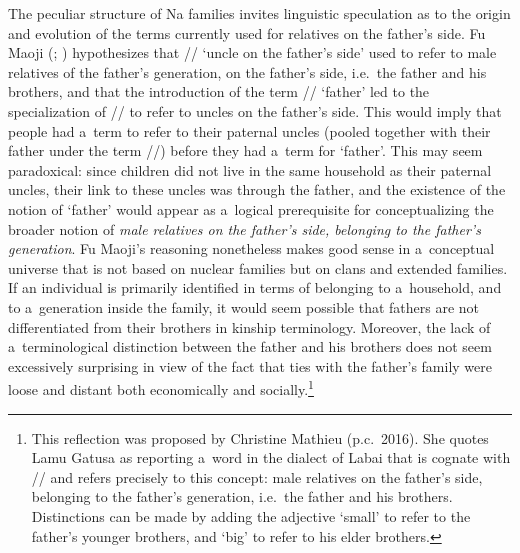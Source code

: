 	The peculiar structure of Na families invites linguistic speculation as to the origin and
	evolution of the terms currently used for relatives on the father’s
	side. Fu Maoji (\citeyear[23]{fu1980}; \citeyear[38–39]{fu1983}) hypothesizes that // ‘uncle on the father’s side’ used to refer to male
	relatives of the father’s generation, on the father’s side, i.e.\ the father and his brothers, and
	that the introduction of the term // ‘father’ led to the specialization of
	// to refer to uncles on the father’s side. This would imply that people had a~term to
	refer to their paternal uncles (pooled together with their father under the term //)
	before they had a~term for ‘father’. This may seem paradoxical: since children did not live in the same household as their
	paternal uncles, their link to these uncles was through the father, and the existence of the notion of ‘father’ would appear as a~logical prerequisite for conceptualizing the broader notion of \textit{male relatives on the father's side, belonging to the father's generation}. Fu Maoji's reasoning nonetheless makes good sense in a~conceptual universe that is not based on nuclear families but on clans and extended families. If an individual is primarily identified in terms of belonging to a~household, and to a~generation inside the family, it would seem possible that fathers are not differentiated from their brothers in kinship terminology. Moreover, the lack of a~terminological distinction between the father and his brothers does not seem excessively surprising in view of the fact that ties with the father's family were loose and distant both economically and socially.\footnote{This reflection was proposed by Christine Mathieu (p.c.\ 2016). She quotes Lamu Gatusa  as reporting a~word in the dialect of Labai  that is cognate with // and refers precisely to this concept: male relatives on the father's side, belonging to the father's generation, i.e.\ the father and his brothers. Distinctions can be made by adding the adjective ‘small’ to refer to the father's younger brothers, and ‘big’ to refer to his elder brothers.}
	
